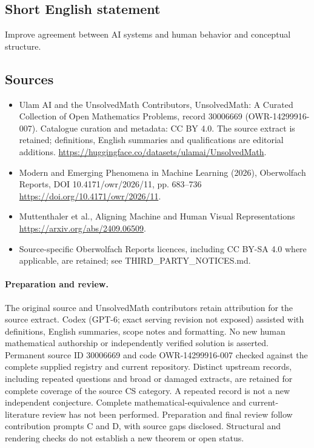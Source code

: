 \documentclass[11pt]{article}
\begin{document}
\subsection{Short English statement}
Improve agreement between AI systems and human behavior and conceptual structure.
\subsection{Sources}
\begin{itemize}
\item[\hypertarget{source:30006669:1}{S1}] Ulam AI and the UnsolvedMath Contributors, UnsolvedMath: A Curated Collection of Open Mathematics Problems, record 30006669 (OWR-14299916-007). Catalogue curation and metadata: CC BY 4.0. The source extract is retained; definitions, English summaries and qualifications are editorial additions.
\url{https://huggingface.co/datasets/ulamai/UnsolvedMath}.
\item[\hypertarget{source:30006669:2}{S2}] Modern and Emerging Phenomena in Machine Learning (2026), Oberwolfach Reports, DOI 10.4171/owr/2026/11, pp. 683--736
\url{https://doi.org/10.4171/owr/2026/11}.
\item[\hypertarget{source:30006669:3}{S3}] Muttenthaler et al., Aligning Machine and Human Visual Representations
\url{https://arxiv.org/abs/2409.06509}.
\item Source-specific Oberwolfach Reports licences, including CC BY-SA 4.0 where applicable, are retained; see THIRD\_PARTY\_NOTICES.md.
\end{itemize}
\paragraph{Preparation and review.}
The original source and UnsolvedMath contributors retain attribution for the source extract. Codex (GPT-6; exact serving revision not exposed) assisted with definitions, English summaries, scope notes and formatting. No new human mathematical authorship or independently verified solution is asserted. Permanent source ID 30006669 and code OWR-14299916-007 checked against the complete supplied registry and current repository. Distinct upstream records, including repeated questions and broad or damaged extracts, are retained for complete coverage of the source CS category. A repeated record is not a new independent conjecture. Complete mathematical-equivalence and current-literature review has not been performed. Preparation and final review follow contribution prompts C and D, with source gaps disclosed. Structural and rendering checks do not establish a new theorem or open status.
\label{end:30006669}
\end{document}
